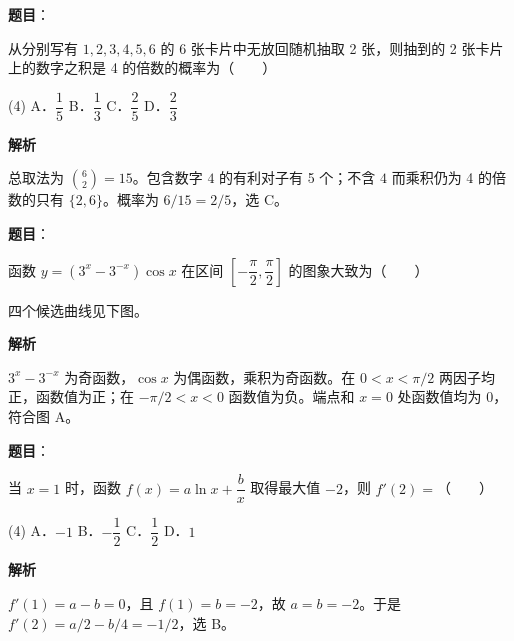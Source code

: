 \begin{answer}

\textbf{题目}：

从分别写有 $1,2,3,4,5,6$ 的 6 张卡片中无放回随机抽取 2 张，则抽到的 2 张卡片上的数字之积是 4 的倍数的概率为\mbox{（　　）}

\begin{gkopts}(4)
\task A．$\dfrac15$
\task B．$\dfrac13$
\task C．$\dfrac25$
\task D．$\dfrac23$
\end{gkopts}

\textbf{解析}

总取法为 $\binom62=15$。包含数字 $4$ 的有利对子有 5 个；不含 $4$ 而乘积仍为 4 的倍数的只有 $\{2,6\}$。概率为 $6/15=2/5$，选 C。


\end{answer}
\begin{answer}

\textbf{题目}：

函数 $y=(3^x-3^{-x})\cos x$ 在区间 $\left[-\dfrac{\pi}{2},\dfrac{\pi}{2}\right]$ 的图象大致为\mbox{（　　）}

四个候选曲线见下图。
\nopagebreak[4]
\begin{center}\end{center}
\nopagebreak[4]
\textbf{解析}

$3^x-3^{-x}$ 为奇函数，$\cos x$ 为偶函数，乘积为奇函数。在 $0<x<\pi/2$ 两因子均正，函数值为正；在 $-\pi/2<x<0$ 函数值为负。端点和 $x=0$ 处函数值均为 $0$，符合图 A。


\end{answer}
\begin{answer}

\textbf{题目}：

当 $x=1$ 时，函数 $f(x)=a\ln x+\dfrac bx$ 取得最大值 $-2$，则 $f'(2)=$\mbox{（　　）}

\begin{gkopts}(4)
\task A．$-1$
\task B．$-\dfrac12$
\task C．$\dfrac12$
\task D．$1$
\end{gkopts}

\textbf{解析}

$f'(1)=a-b=0$，且 $f(1)=b=-2$，故 $a=b=-2$。于是 $f'(2)=a/2-b/4=-1/2$，选 B。


\end{answer}
